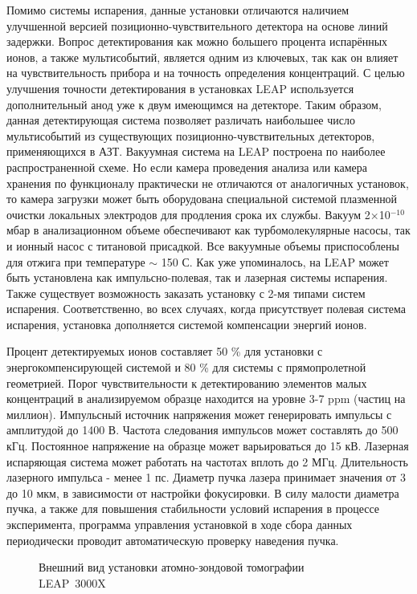 Помимо системы испарения, данные установки отличаются наличием улучшенной версией позиционно-чувствительного детектора на основе линий задержки. Вопрос детектирования как можно большего процента испарённых ионов, а также мультисобытий, является одним из ключевых, так как он влияет на чувствительность прибора и на точность определения концентраций. С целью улучшения точности детектирования в установках LEAP используется дополнительный анод уже к двум имеющимся на детекторе. Таким образом, данная детектирующая система позволяет различать наибольшее число мультисобытий из существующих позиционно-чувствительных детекторов, применяющихся в АЗТ.
Вакуумная система на LEAP построена по наиболее распространенной схеме. Но если камера проведения анализа или камера хранения по функционалу практически не отличаются от аналогичных установок, то камера загрузки может быть оборудована специальной системой плазменной очистки локальных электродов для продления срока их службы. Вакуум 2×10$^{-10}$ мбар в анализационном объеме обеспечивают как турбомолекулярные насосы, так и ионный насос с титановой присадкой. Все вакуумные объемы приспособлены для отжига при температуре $\sim$ 150 \textdegree С.
Как уже упоминалось, на LEAP может быть установлена как импульсно-полевая, так и лазерная системы испарения. Также существует возможность заказать установку с 2-мя типами систем испарения. Соответственно, во всех случаях, когда присутствует полевая система испарения, установка дополняется системой компенсации энергий ионов.

Процент детектируемых ионов составляет 50 \% для установки с энергокомпенсирующей системой и 80 \% для системы с прямопролетной геометрией. Порог чувствительности к детектированию элементов малых концентраций в анализируемом образце находится на уровне 3-7 ppm (частиц на миллион). Импульсный источник напряжения может генерировать импульсы с амплитудой до 1400 В. Частота следования импульсов может составлять до 500 кГц. Постоянное напряжение на образце может варьироваться до 15 кВ. Лазерная испаряющая система может работать на частотах вплоть до 2 МГц. Длительность лазерного импульса - менее 1 пс. Диаметр пучка лазера принимает значения от 3 до 10 мкм, в зависимости от настройки фокусировки. В силу малости диаметра пучка, а также для повышения стабильности условий испарения в процессе эксперимента, программа управления установкой в ходе сбора данных периодически проводит автоматическую проверку наведения пучка.

\begin{figure}[htb]
	\caption{Внешний вид установки атомно-зондовой томографии LEAP~3000X~\cite{LEAP3000}}
	\label{fig:leap3000}
\end{figure}

